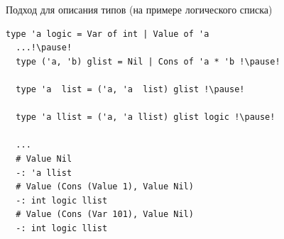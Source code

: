 \documentclass[10pt, mathserif]{beamer}
\theoremstyle{definition}
\begin{document}
\begin{frame}[fragile]{Подход для описания типов (на примере логического списка)}
  \begin{lstlisting}[mathescape=true]
  type 'a logic = Var of int | Value of 'a
  ...!\pause!
  type ('a, 'b) glist = Nil | Cons of 'a * 'b !\pause!

  type 'a  list = ('a, 'a  list) glist !\pause!

  type 'a llist = ('a, 'a llist) glist logic !\pause!

  ...
  # Value Nil
  -: 'a llist
  # Value (Cons (Value 1), Value Nil)
  -: int logic llist
  # Value (Cons (Var 101), Value Nil)
  -: int logic llist
  \end{lstlisting}
\end{frame}
%
%
%
%

%
%
%
\end{document}
